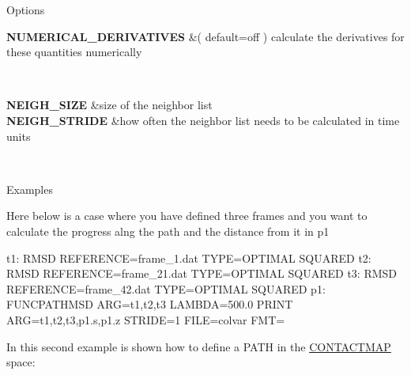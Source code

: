 \begin{DoxyParagraph}{Options}

\end{DoxyParagraph}
\begin{TabularC}{2}
\hline
{\bfseries  N\+U\+M\+E\+R\+I\+C\+A\+L\+\_\+\+D\+E\+R\+I\+V\+A\+T\+I\+V\+E\+S } &( default=off ) calculate the derivatives for these quantities numerically  

\\
\end{TabularC}


\begin{TabularC}{2}
\hline
{\bfseries  N\+E\+I\+G\+H\+\_\+\+S\+I\+Z\+E } &size of the neighbor list   \\
{\bfseries  N\+E\+I\+G\+H\+\_\+\+S\+T\+R\+I\+D\+E } &how often the neighbor list needs to be calculated in time units  

\\
\end{TabularC}


\begin{DoxyParagraph}{Examples}

\end{DoxyParagraph}
Here below is a case where you have defined three frames and you want to calculate the progress alng the path and the distance from it in p1

\begin{DoxyVerb}t1: RMSD REFERENCE=frame_1.dat TYPE=OPTIMAL SQUARED
t2: RMSD REFERENCE=frame_21.dat TYPE=OPTIMAL SQUARED
t3: RMSD REFERENCE=frame_42.dat TYPE=OPTIMAL SQUARED
p1: FUNCPATHMSD ARG=t1,t2,t3 LAMBDA=500.0 
PRINT ARG=t1,t2,t3,p1.s,p1.z STRIDE=1 FILE=colvar FMT=%
\end{DoxyVerb}


In this second example is shown how to define a P\+A\+T\+H in the \hyperlink{CONTACTMAP}{C\+O\+N\+T\+A\+C\+T\+M\+A\+P} space\+:

